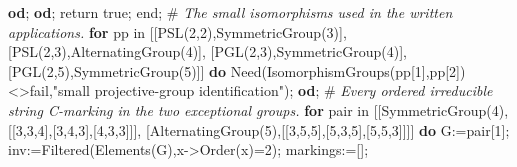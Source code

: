 \documentclass[
  11pt,
  a4paper,
]{article}
\newenvironment{Shaded}{}{}
\newcommand{\BuiltInTok}[1]{\textcolor[rgb]{0.00,0.50,0.00}{#1}}
\newcommand{\CommentTok}[1]{\textcolor[rgb]{0.38,0.63,0.69}{\textit{#1}}}
\newcommand{\ConstantTok}[1]{\textcolor[rgb]{0.53,0.00,0.00}{#1}}
\newcommand{\ControlFlowTok}[1]{\textcolor[rgb]{0.00,0.44,0.13}{\textbf{#1}}}
\newcommand{\ExtensionTok}[1]{#1}
\newcommand{\FloatTok}[1]{\textcolor[rgb]{0.25,0.63,0.44}{#1}}
\newcommand{\FunctionTok}[1]{\textcolor[rgb]{0.02,0.16,0.49}{#1}}
\newcommand{\NormalTok}[1]{#1}
\newcommand{\OperatorTok}[1]{\textcolor[rgb]{0.40,0.40,0.40}{#1}}
\newcommand{\StringTok}[1]{\textcolor[rgb]{0.25,0.44,0.63}{#1}}
\newcommand{\VariableTok}[1]{\textcolor[rgb]{0.10,0.09,0.49}{#1}}
\begin{document}
\begin{Shaded}
\begin{Highlighting}[]
  \ControlFlowTok{od}\OperatorTok{;} \ControlFlowTok{od}\OperatorTok{;} \ExtensionTok{return} \ConstantTok{true}\OperatorTok{;}
\FunctionTok{end}\OperatorTok{;}
\NormalTok{\#}\CommentTok{ The small isomorphisms used in the written applications.}
\ControlFlowTok{for} \VariableTok{pp} \ExtensionTok{in}\NormalTok{ [[}\VariableTok{PSL}\NormalTok{(}\FloatTok{2}\OperatorTok{,}\FloatTok{2}\NormalTok{)}\OperatorTok{,}\BuiltInTok{SymmetricGroup}\NormalTok{(}\FloatTok{3}\NormalTok{)]}\OperatorTok{,}\NormalTok{[}\VariableTok{PSL}\NormalTok{(}\FloatTok{2}\OperatorTok{,}\FloatTok{3}\NormalTok{)}\OperatorTok{,}\BuiltInTok{AlternatingGroup}\NormalTok{(}\FloatTok{4}\NormalTok{)]}\OperatorTok{,}
\NormalTok{           [}\VariableTok{PGL}\NormalTok{(}\FloatTok{2}\OperatorTok{,}\FloatTok{3}\NormalTok{)}\OperatorTok{,}\BuiltInTok{SymmetricGroup}\NormalTok{(}\FloatTok{4}\NormalTok{)]}\OperatorTok{,}\NormalTok{[}\VariableTok{PGL}\NormalTok{(}\FloatTok{2}\OperatorTok{,}\FloatTok{5}\NormalTok{)}\OperatorTok{,}\BuiltInTok{SymmetricGroup}\NormalTok{(}\FloatTok{5}\NormalTok{)]] }\ControlFlowTok{do}
  \VariableTok{Need}\NormalTok{(}\BuiltInTok{IsomorphismGroups}\NormalTok{(}\VariableTok{pp}\NormalTok{[}\FloatTok{1}\NormalTok{]}\OperatorTok{,}\VariableTok{pp}\NormalTok{[}\FloatTok{2}\NormalTok{])}\OperatorTok{\textless{}\textgreater{}}\ConstantTok{fail}\OperatorTok{,}\StringTok{"small projective{-}group identification"}\NormalTok{)}\OperatorTok{;}
\ControlFlowTok{od}\OperatorTok{;}
\NormalTok{\#}\CommentTok{ Every ordered irreducible string C{-}marking in the two exceptional groups.}
\ControlFlowTok{for} \VariableTok{pair} \ExtensionTok{in}\NormalTok{ [[}\BuiltInTok{SymmetricGroup}\NormalTok{(}\FloatTok{4}\NormalTok{)}\OperatorTok{,}\NormalTok{[[}\FloatTok{3}\OperatorTok{,}\FloatTok{3}\OperatorTok{,}\FloatTok{4}\NormalTok{]}\OperatorTok{,}\NormalTok{[}\FloatTok{3}\OperatorTok{,}\FloatTok{4}\OperatorTok{,}\FloatTok{3}\NormalTok{]}\OperatorTok{,}\NormalTok{[}\FloatTok{4}\OperatorTok{,}\FloatTok{3}\OperatorTok{,}\FloatTok{3}\NormalTok{]]]}\OperatorTok{,}
\NormalTok{             [}\BuiltInTok{AlternatingGroup}\NormalTok{(}\FloatTok{5}\NormalTok{)}\OperatorTok{,}\NormalTok{[[}\FloatTok{3}\OperatorTok{,}\FloatTok{5}\OperatorTok{,}\FloatTok{5}\NormalTok{]}\OperatorTok{,}\NormalTok{[}\FloatTok{5}\OperatorTok{,}\FloatTok{3}\OperatorTok{,}\FloatTok{5}\NormalTok{]}\OperatorTok{,}\NormalTok{[}\FloatTok{5}\OperatorTok{,}\FloatTok{5}\OperatorTok{,}\FloatTok{3}\NormalTok{]]]] }\ControlFlowTok{do}
  \VariableTok{G}\OperatorTok{:=}\VariableTok{pair}\NormalTok{[}\FloatTok{1}\NormalTok{]}\OperatorTok{;} \VariableTok{inv}\OperatorTok{:=}\BuiltInTok{Filtered}\NormalTok{(}\BuiltInTok{Elements}\NormalTok{(}\VariableTok{G}\NormalTok{)}\OperatorTok{,}\VariableTok{x}\OperatorTok{{-}\textgreater{}}\BuiltInTok{Order}\NormalTok{(}\VariableTok{x}\NormalTok{)}\OperatorTok{=}\FloatTok{2}\NormalTok{)}\OperatorTok{;} \VariableTok{markings}\OperatorTok{:=}\NormalTok{[]}\OperatorTok{;}

\end{Highlighting}
\end{Shaded}
\end{document}
